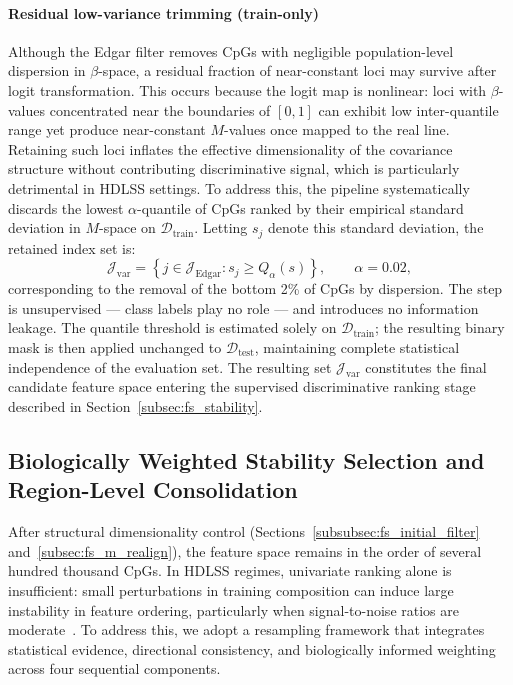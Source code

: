 \paragraph{Residual low-variance trimming (train-only)}

Although the Edgar filter removes CpGs with negligible population-level
dispersion in $\beta$-space, a residual fraction of near-constant loci may
survive after logit transformation. This occurs because the logit map is
nonlinear: loci with $\beta$-values concentrated near the boundaries of $[0,1]$
can exhibit low inter-quantile range yet produce near-constant $M$-values once
mapped to the real line. Retaining such loci inflates the effective dimensionality
of the covariance structure without contributing discriminative signal, which
is particularly detrimental in HDLSS settings.
To address this, the pipeline systematically discards the lowest
$\alpha$-quantile of CpGs ranked by their empirical standard deviation in
$M$-space on $\mathcal{D}_{\mathrm{train}}$. Letting $s_j$ denote this
standard deviation, the retained index set is:
\begin{equation}
    \mathcal{J}_{\mathrm{var}}
    =
    \left\{
        j \in \mathcal{J}_{\mathrm{Edgar}} :
        s_j \geq Q_{\alpha}(s)
    \right\},
    \qquad
    \alpha = 0.02,
\end{equation}
corresponding to the removal of the bottom 2\% of CpGs by dispersion.
The step is unsupervised — class labels play no role — and introduces no
information leakage. The quantile threshold is estimated solely on
$\mathcal{D}_{\mathrm{train}}$; the resulting binary mask is then applied
unchanged to $\mathcal{D}_{\mathrm{test}}$, maintaining complete statistical
independence of the evaluation set.
The resulting set $\mathcal{J}_{\mathrm{var}}$ constitutes the final candidate
feature space entering the supervised discriminative ranking stage described
in Section~\ref{subsec:fs_stability}.

\subsection{Biologically Weighted Stability Selection and Region-Level Consolidation}
\label{subsec:fs_stability_ranking}

After structural dimensionality control 
(Sections~\ref{subsubsec:fs_initial_filter} 
and~\ref{subsec:fs_m_realign}), the feature space remains 
in the order of several hundred thousand CpGs. In HDLSS 
regimes, univariate ranking alone is insufficient: small 
perturbations in training composition can induce large 
instability in feature ordering, particularly when 
signal-to-noise ratios are 
moderate~\cite{Hall2005, Donoho2000}. To address this, we 
adopt a resampling framework that integrates statistical 
evidence, directional consistency, and biologically informed 
weighting across four sequential components.

